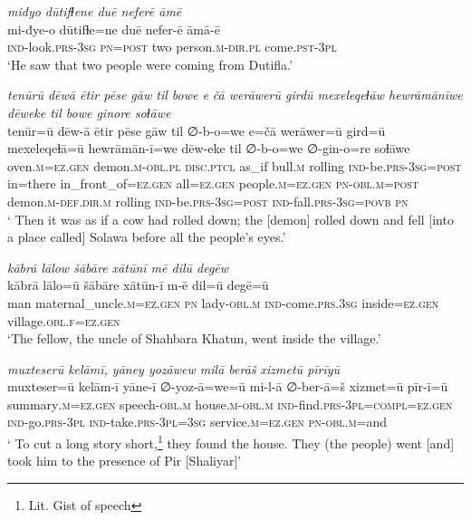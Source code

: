\ea \label{ŽP.191}
\textit{miđyo dūtifɫene duē neferē āmē} \\ 
\gll mi-đye-o dūtifɫe=ne duē nefer-ē āmā-ē \\ 
 \textsc{ind-}look\textsc{.prs}\textsc{-3sg} \textsc{pn}\textsc{=\textsc{post}} two person\textsc{.m}\textsc{-dir}\textsc{.pl} come\textsc{.pst}\textsc{-3pl} \\ 
\glt `He saw that two people were coming from Dutifla.'
\z 
 
\ea \label{ŽP.201}
\textit{tenūrū dēwā ētir pēse gāw til bowe e čā werāwerū girdū mexeleqeɫāw hewrāmānīwe dēweke til bowe ginore soɫāwe} \\ 
\gll tenūr=ū dēw-ā ētir pēse gāw til ∅-b-o=we e=čā werāwer=ū gird=ū mexeleqeɫā=ū hewrāmān-ī=we dēw-eke til ∅-b-o=we ∅-gin-o=re soɫāwe \\ 
 oven\textsc{.m}\textsc{\textsc{=ez.gen}} demon\textsc{.m}\textsc{-obl}\textsc{.pl} \textsc{disc.ptcl} as\_if bull\textsc{.m} rolling \textsc{ind-}be\textsc{.prs}\textsc{-3sg}\textsc{=\textsc{post}} in=there in\_front\_of\textsc{\textsc{=ez.gen}} all\textsc{\textsc{=ez.gen}} people\textsc{.m}\textsc{\textsc{=ez.gen}} \textsc{pn}\textsc{-obl}\textsc{.m}\textsc{=\textsc{post}} demon\textsc{.m}\textsc{-def}\textsc{.dir}\textsc{.m} rolling \textsc{ind-}be\textsc{.prs}\textsc{-3sg}\textsc{=\textsc{post}} \textsc{ind-}fall\textsc{.prs}\textsc{-3sg}\textsc{=\textsc{povb}} \textsc{pn} \\ 
\glt ` Then it was as if a cow had rolled down; the [demon] rolled down and fell [into a place called] Solawa before all the people’s eyes.'
\z 
 
\ea \label{ŽP.203}
\textit{kābrā lālow šābāre xātūnī mē dilū degēw} \\ 
\gll kābrā lālo=ū šābāre xātūn-ī m-ē dil=ū degē=ū \\ 
 man maternal\_uncle\textsc{.m}\textsc{\textsc{=ez.gen}} \textsc{pn} lady\textsc{-obl}\textsc{.m} \textsc{ind-}come\textsc{.prs}\textsc{.3sg} inside\textsc{\textsc{=ez.gen}} village\textsc{.obl}\textsc{.f}\textsc{\textsc{=ez.gen}} \\ 
\glt `The fellow, the uncle of Shahbara Khatun, went inside the village.'
\z 
 
\ea \label{ŽP.205}
\textit{muxteserū kelāmī, yāney yozāwew milā berāš xizmetū pīrīyū} \\ 
\gll muxteser=ū kelām-ī yāne-ī ∅-yoz-ā=we=ū mi-l-ā ∅-ber-ā=š xizmet=ū pīr-ī=ū \\ 
 summary\textsc{.m}\textsc{\textsc{=ez.gen}} speech\textsc{-obl}\textsc{.m} house\textsc{.m}\textsc{-obl}\textsc{.m} \textsc{ind-}find\textsc{.prs}\textsc{-3pl}\textsc{=compl}\textsc{\textsc{=ez.gen}} \textsc{ind-}go\textsc{.prs}\textsc{-3pl} \textsc{ind-}take\textsc{.prs}\textsc{-3pl}\textsc{=3sg} service\textsc{.m}\textsc{\textsc{=ez.gen}} \textsc{pn}\textsc{-obl}\textsc{.m}=and \\ 
\glt ` To cut a long story short,\footnote{Lit. Gist of speech} they found the house. They (the people) went [and] took him to the presence of Pir [Shaliyar]'
\z 
 
